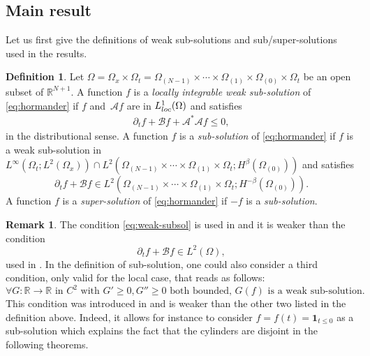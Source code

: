 \documentclass[10pt]{amsart}
\newcommand{\loc}{\textup{loc}}
\theoremstyle{definition}
\newtheorem{definition}[theorem]{Definition}
\newtheorem{remark}[theorem]{Remark}
\newcommand{\cA}{{\mathcal A}}
\newcommand{\cB}{{\mathcal B}}
\begin{document}
\subsection{Main result}
\label{sec:aim}
Let us first give the definitions of weak sub-solutions and sub/super-solutions used in the results.
\begin{definition}
\label{def_weak_sol}
Let $\Omega=\Omega_x\times \Omega_t=\Omega_{(N-1)}\times \cdots \times \Omega_{(1)}\times \Omega_{(0)}\times \Omega_t$ be an open subset of $\mathbb{R}^{N+1}$.
A function $f$ is a \emph{locally integrable weak sub-solution} of \eqref{eq:hormander} if $f$ and~$\cA f$ are in $L^{1}_{\loc}(\Omega)$ and satisfies
\begin{align*}
\partial_t f + \cB f + \cA^* \cA f \leq 0,
\end{align*}
in the distributional sense. A function $f$ is a \emph{sub-solution} of \eqref{eq:hormander} if $f$ is a weak sub-solution in $L^\infty(\Omega_{t};L^2(\Omega_x))\cap L^2(\Omega_{(N-1)}\times \cdots \times \Omega_{(1)}\times \Omega_t; H^{\beta}(\Omega_{(0)}))$ and satisfies
\begin{equation}\label{eq:weak-subsol}
\partial_t f + \cB f\in L^2(\Omega_{(N-1)}\times \cdots \times \Omega_{(1)}\times \Omega_t; H^{-\beta}(\Omega_{(0)})).
\end{equation}
A function $f$ is a \emph{super-solution} of \eqref{eq:hormander} if $-f$ is a \emph{sub-solution}.
\end{definition}
\begin{remark}
The condition \eqref{eq:weak-subsol} is used in \cite{GIMV} and it is weaker than the condition
\[
\partial_t f + \cB f\in L^{2}(\Omega),\]
used in \cite{PP}. In the definition of sub-solution, one could also consider a third condition, only valid for the local case, that reads as follows:
\[
\forall G:\mathbb{R}\rightarrow \mathbb{R} \textrm{ in } C^2\textrm{ with } G'\geq 0, G''\geq 0 \textrm{ both bounded, } G(f) \textrm{ is a weak sub-solution}.\]
This condition was introduced in \cite{guerand-mouhot} and is weaker than the other two listed in the definition above. Indeed, it allows for instance to consider $f=f(t)=\mathbf{1}_{t\leq 0}$ as a sub-solution which explains the fact that the cylinders are disjoint in the following theorems.
\end{remark}
\end{document}
